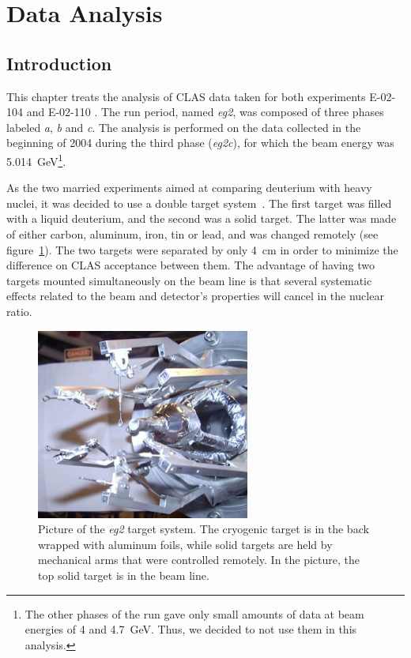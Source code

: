 \section{Data Analysis}
\label{chap:analysis}

\subsection{Introduction}

This chapter treats the analysis of CLAS data taken for both 
experiments E-02-104 \cite{Brooks:2002aa} and E-02-110 \cite{Hafidi:2002aa}.
The run period, named {\it eg2}, was composed of three phases 
labeled {\it a}, {\it b} and {\it c}. The analysis is performed on the data 
collected in the beginning of 2004 during the third phase ({\it eg2c}), for 
which the beam energy was 5.014~GeV\footnote{The other phases of the run gave only small amounts of data at beam energies of 4 and 4.7~GeV. Thus, we decided to not use them in this analysis.}.

As the two married experiments aimed at comparing deuterium with heavy nuclei, it was decided to use a double target system~\cite{Hakobyan:2008zz}. The first target was filled with a liquid deuterium, and the second was a solid target. The latter was made of either carbon, aluminum, iron, tin or lead, and was changed remotely (see figure~\ref{fig:phototarget}). The two targets were separated by only 4~cm in order to minimize the difference on CLAS acceptance between them. The advantage of having two targets mounted simultaneously on the beam line is that several systematic effects related to the beam and detector's properties will cancel in the nuclear ratio.

\begin{figure}[htbp]
\centering
\includegraphics[width=7cm] {chap5-fig/PhTar.jpg} 
\caption {Picture of the {\it eg2} target system. The cryogenic target is 
in the back wrapped with aluminum foils, while solid targets are held by mechanical arms that were controlled remotely. In the picture, the top solid target is in the beam line.}
\label{fig:phototarget}
\end{figure}

